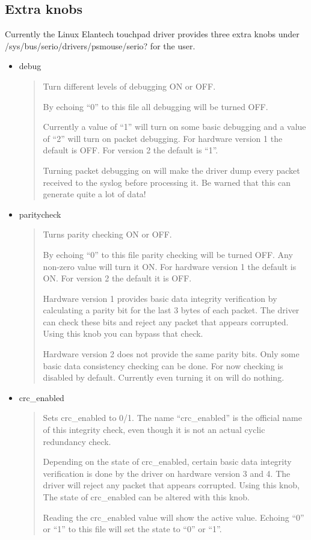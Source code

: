 \documentclass[a4paper,8pt,english]{sphinxmanual}
\begin{document}
\subsection{Extra knobs}
\label{input/devices/elantech:extra-knobs}
Currently the Linux Elantech touchpad driver provides three extra knobs under
/sys/bus/serio/drivers/psmouse/serio? for the user.
\begin{itemize}
\item {} 
debug
\begin{quote}

Turn different levels of debugging ON or OFF.

By echoing ``0'' to this file all debugging will be turned OFF.

Currently a value of ``1'' will turn on some basic debugging and a value of
``2'' will turn on packet debugging. For hardware version 1 the default is
OFF. For version 2 the default is ``1''.

Turning packet debugging on will make the driver dump every packet
received to the syslog before processing it. Be warned that this can
generate quite a lot of data!
\end{quote}

\item {} 
paritycheck
\begin{quote}

Turns parity checking ON or OFF.

By echoing ``0'' to this file parity checking will be turned OFF. Any
non-zero value will turn it ON. For hardware version 1 the default is ON.
For version 2 the default it is OFF.

Hardware version 1 provides basic data integrity verification by
calculating a parity bit for the last 3 bytes of each packet. The driver
can check these bits and reject any packet that appears corrupted. Using
this knob you can bypass that check.

Hardware version 2 does not provide the same parity bits. Only some basic
data consistency checking can be done. For now checking is disabled by
default. Currently even turning it on will do nothing.
\end{quote}

\item {} 
crc\_enabled
\begin{quote}

Sets crc\_enabled to 0/1. The name ``crc\_enabled'' is the official name of
this integrity check, even though it is not an actual cyclic redundancy
check.

Depending on the state of crc\_enabled, certain basic data integrity
verification is done by the driver on hardware version 3 and 4. The
driver will reject any packet that appears corrupted. Using this knob,
The state of crc\_enabled can be altered with this knob.

Reading the crc\_enabled value will show the active value. Echoing
``0'' or ``1'' to this file will set the state to ``0'' or ``1''.
\end{quote}

\end{itemize}
\end{document}
